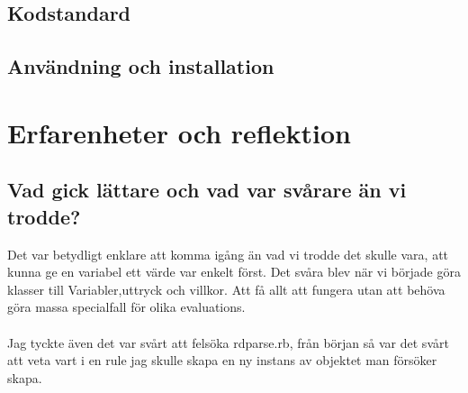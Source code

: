 \documentclass{TDP003mall}
\begin{document}
\subsection{Kodstandard}

\subsection{Användning och installation}

\section{Erfarenheter och reflektion}
\subsection{Vad gick lättare och vad var svårare än vi trodde?}
Det var betydligt enklare att komma igång än vad vi trodde det skulle vara, att kunna ge en variabel ett värde var enkelt först. Det svåra blev när vi började göra klasser till Variabler,uttryck och villkor. Att få allt att fungera utan att behöva göra massa specialfall för olika evaluations. \\\\
Jag tyckte även det var svårt att felsöka rdparse.rb, från början så var det svårt att veta vart i en rule jag skulle skapa en ny instans av objektet man försöker skapa.
\end{document}
